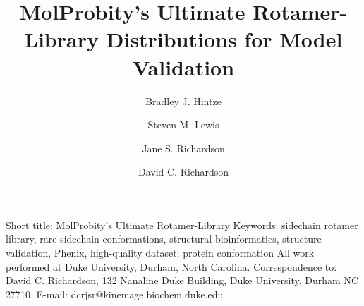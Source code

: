 \title{MolProbity's Ultimate Rotamer-Library Distributions for Model Validation}
\author{Bradley J. Hintze}
\author{Steven M. Lewis}
\author{Jane S. Richardson}
\author{David C. Richardson}
\maketitle

\noindent
Short title: MolProbity's Ultimate Rotamer-Library
\newline
\newline
\noindent
Keywords: sidechain rotamer library, rare sidechain conformations, structural bioinformatics, structure validation, Phenix, high-quality dataset, protein conformation
\newline
\newline
\noindent
All work performed at Duke University, Durham, North Carolina.
\newline
\newline
\noindent
Correspondence to: David C. Richardson, 132 Nanaline Duke Building, Duke University, Durham NC 27710. E-mail: dcrjsr@kinemage.biochem.duke.edu
